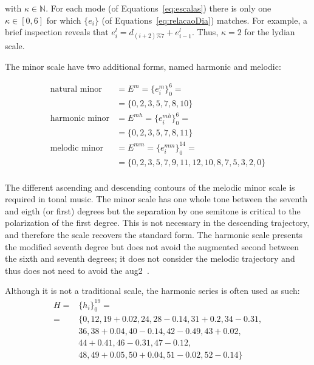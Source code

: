 \documentclass[format=acmsmall, review=false, screen=true]{acmart}
\begin{document}
\noindent with $\kappa \in \mathbb{N}$. For each mode (of Equations~\ref{eq:escalas}) there is only one $\kappa \in [0,6]$ for which $\{e_i\}$ (of Equations~\ref{eq:relacaoDia}) matches. 
For example, a brief inspection reveals that
$e_i^{l}=d_{(i+2)\%7}+e_{i-1}^{l}$. Thus, $\kappa=2$ for the lydian scale.

The minor scale have two additional forms, named harmonic and melodic:

\begin{equation}\label{eq:escalasMenores}
\begin{split}
\text{natural minor}&  = E^m = \{e_i^m\}_0^6 = \\
                                           &  = \{0,2,3,5,7,8,10\} \\
\text{harmonic minor}                      &  = E^{mh} = \{e_i^{mh}\}_0^6 = \\
                                           &  = \{0,2,3,5,7,8,11\} \\
\text{melodic minor}                       &  = E^{mm} = \{e_i^{mm}\}_0^{14} = \\
                                           &  = \{0,2,3,5,7,9,11,12,10,8,7,5,3,2,0\} \\
\end{split}
\end{equation}

The different ascending and descending contours of the melodic minor scale is required in tonal music.
The minor scale has one whole tone between the seventh and eigth (or first) degrees but
the separation by one semitone is critical to the polarization of the first degree.
This is not necessary in the descending trajectory, and therefore the scale recovers the standard form.
The harmonic scale presents the modified seventh degree but does not avoid the augmented second between the sixth and seventh degrees; it does not consider the melodic trajectory and thus does not need to avoid the aug2~\cite{Harmonia}.

Although it is not a traditional scale, the harmonic series is often used as such:
\begin{equation}\label{eq:serieHarmonica}
\begin{split}
H = & \{h_i\}_0^{19}= \\
    =  & \{ 0,12,19+0.02,  24,28-0.14, 31+0.2, 34-0.31, \\
                     & 36, 38+0.04,40-0.14, 42-0.49, 43+0.02, \\
                     & 44+0.41, 46-0.31, 47-0.12, \\
                     & 48, 49+0.05, 50+0.04, 51-0.02, 52-0.14   \}
\end{split}
\end{equation}
\end{document}
